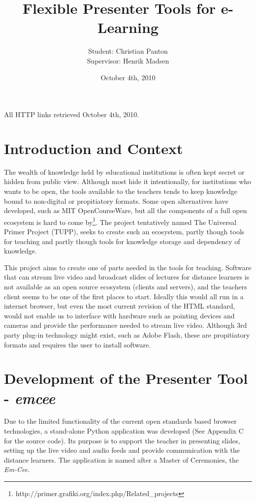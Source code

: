 \documentclass[a4paper,12pt]{article}
\begin{document}
\title{Flexible Presenter Tools for e-Learning}
\author{Student: Christian Panton\\
Supervisor: Henrik Madsen}
\date{October 4th, 2010}

\maketitle
\newpage

\tableofcontents
\vspace{20 mm}
All HTTP links retrieved October 4th, 2010.
\newpage


\section{Introduction and Context}
The wealth of knowledge held by educational institutions is often kept secret or hidden from public view. Although most hide it intentionally, for institutions who wants to be open, the tools available to the teachers tends to keep knowledge bound to non-digital or propitiatory formats. Some open alternatives have developed, such as MIT OpenCourseWare, but all the components of a full open ecosystem is hard to come by\footnote{http://primer.grafiki.org/index.php/Related\_projects}. The project tentatively named The Universal Primer Project (TUPP), seeks to create such an ecosystem, partly though tools for teaching and partly though tools for knowledge storage and dependency of knowledge.

This project aims to create one of parts needed in the tools for teaching. Software that can stream live video and broadcast slides of lectures for distance learners is not available as an open source ecosystem (clients and servers), and the teachers client seems to be one of the first places to start. Ideally this would all run in a internet browser, but even the most current revision of the HTML standard, would not enable us to interface with hardware such as pointing devices and cameras and provide the performance needed to stream live video. Although 3rd party plug-in technology might exist, such as Adobe Flash, these are propitiatory formats and requires the user to install software.

\section{Development of the Presenter Tool - \emph{emcee}}
Due to the limited functionality of the current open standards based browser technologies, a stand-alone Python application was developed (See Appendix C for the source code). Its purpose is to support the teacher in presenting slides, setting up the live video and audio feeds and provide communication with the distance learners. The application is named after a Master of Ceremonies, the \emph{Em-Cee}.
\end{document}
